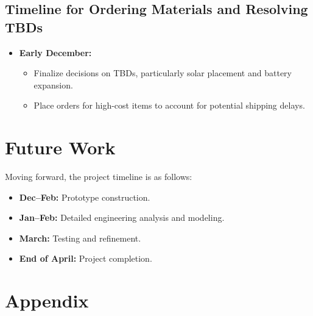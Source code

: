 \documentclass[12pt]{article}
\begin{document}
\subsection{Timeline for Ordering Materials and Resolving TBDs}
\begin{itemize}
    \item \textbf{Early December:}
    \begin{itemize}
        \item Finalize decisions on TBDs, particularly solar placement and battery expansion.
        \item Place orders for high-cost items to account for potential shipping delays.
    \end{itemize}
\end{itemize}
\section{Future Work}
\label{sec:future_work}

Moving forward, the project timeline is as follows:
\begin{itemize}
    \item \textbf{Dec--Feb:} Prototype construction.
    \item \textbf{Jan--Feb:} Detailed engineering analysis and modeling.
    \item \textbf{March:} Testing and refinement.
    \item \textbf{End of April:} Project completion.
\end{itemize}

\newpage



\newpage

\section{Appendix}
\end{document}
